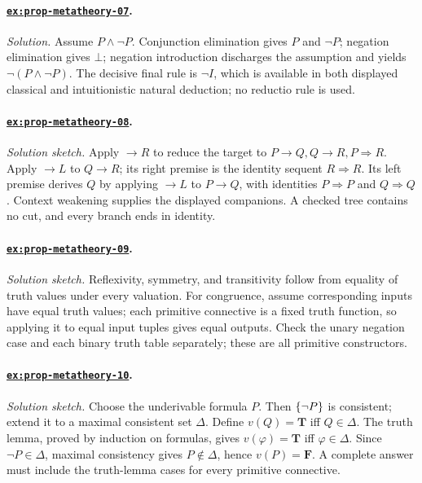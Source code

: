 \documentclass[11pt,oneside,openany]{book}
\theoremstyle{definition}
\theoremstyle{plain}
\theoremstyle{remark}
\DeclarePairedDelimiter{\set}{\lbrace}{\rbrace}
\newcommand{\True}{\mathbf{T}}
\newcommand{\False}{\mathbf{F}}
\newcommand{\bottom}{\bot}
\begin{document}
\paragraph{\hyperref[ex:prop-metatheory-07]{\texttt{ex:prop-metatheory-07}}.}
\textit{Solution.}  Assume \(P\land\neg P\).  Conjunction elimination gives
\(P\) and \(\neg P\); negation elimination gives \(\bottom\); negation
introduction discharges the assumption and yields \(\neg(P\land\neg P)\).
The decisive final rule is \(\neg I\), which is available in both displayed
classical and intuitionistic natural deduction; no reductio rule is used.

\paragraph{\hyperref[ex:prop-metatheory-08]{\texttt{ex:prop-metatheory-08}}.}
\textit{Solution sketch.}  Apply \(\to R\) to reduce the target to
\(P\to Q,Q\to R,P\Rightarrow R\).  Apply \(\to L\) to \(Q\to R\); its right
premise is the identity sequent \(R\Rightarrow R\).  Its left premise derives
\(Q\) by applying \(\to L\) to \(P\to Q\), with identities
\(P\Rightarrow P\) and \(Q\Rightarrow Q\).  Context weakening supplies the
displayed companions.  A checked tree contains no cut, and every branch ends in
identity.

\paragraph{\hyperref[ex:prop-metatheory-09]{\texttt{ex:prop-metatheory-09}}.}
\textit{Solution sketch.}  Reflexivity, symmetry, and transitivity follow from
equality of truth values under every valuation.  For congruence, assume
corresponding inputs have equal truth values; each primitive connective is a
fixed truth function, so applying it to equal input tuples gives equal outputs.
Check the unary negation case and each binary truth table separately; these are
all primitive constructors.

\paragraph{\hyperref[ex:prop-metatheory-10]{\texttt{ex:prop-metatheory-10}}.}
\textit{Solution sketch.}  Choose the underivable formula \(P\).  Then
\(\set{\neg P}\) is consistent; extend it to a maximal consistent set
\(\Delta\).  Define \(v(Q)=\True\) iff \(Q\in\Delta\).  The truth
lemma, proved by induction on formulas, gives
\(v(\varphi)=\True\) iff \(\varphi\in\Delta\).  Since \(\neg P\in\Delta\),
maximal consistency gives \(P\notin\Delta\), hence \(v(P)=\False\).  A complete
answer must include the truth-lemma cases for every primitive connective.
\end{document}
